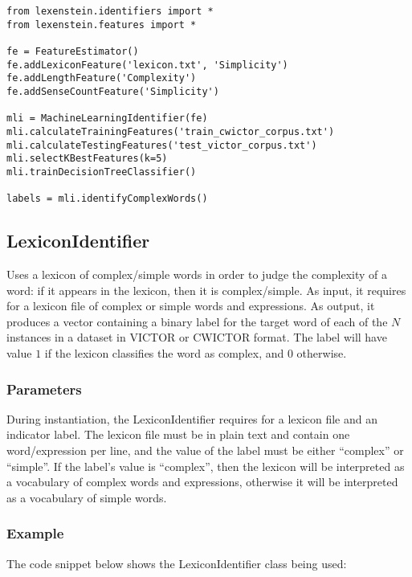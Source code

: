 \begin{lstlisting}
from lexenstein.identifiers import *
from lexenstein.features import *

fe = FeatureEstimator()
fe.addLexiconFeature('lexicon.txt', 'Simplicity')
fe.addLengthFeature('Complexity')
fe.addSenseCountFeature('Simplicity')

mli = MachineLearningIdentifier(fe)
mli.calculateTrainingFeatures('train_cwictor_corpus.txt')
mli.calculateTestingFeatures('test_victor_corpus.txt')
mli.selectKBestFeatures(k=5)
mli.trainDecisionTreeClassifier()

labels = mli.identifyComplexWords()
\end{lstlisting}





\subsection{LexiconIdentifier}

Uses a lexicon of complex/simple words in order to judge the complexity of a word: if it appears in the lexicon, then it is complex/simple. As input, it requires for a lexicon file of complex or simple words and expressions. As output, it produces a vector containing a binary label for the target word of each of the $N$ instances in a dataset in VICTOR or CWICTOR format. The label will have value $1$ if the lexicon classifies the word as complex, and $0$ otherwise.

\subsubsection{Parameters}

During instantiation, the LexiconIdentifier requires for a lexicon file and an indicator label. The lexicon file must be in plain text and contain one word/expression per line, and the value of the label must be either ``complex'' or ``simple''. If the label's value is ``complex'', then the lexicon will be interpreted as a vocabulary of complex words and expressions, otherwise it will be interpreted as a vocabulary of simple words.

\subsubsection{Example}

The code snippet below shows the LexiconIdentifier class being used:

